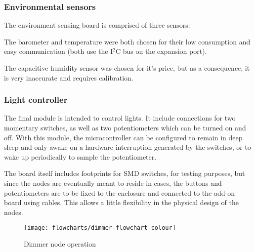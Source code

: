 \subsubsection{Environmental sensors}

The environment sensing board is comprised of three sensors:



The barometer and temperature were both chosen for their low consumption and
easy communication (both use the I$^{2}$C bus on the expansion port).

The capacitive humidity sensor was chosen for it's price, but as a consequence,
it is very inaccurate and requires calibration.

\subsubsection{Light controller}

The final module is intended to control lights. It include connections for two
momentary switches, as well as two potentiometers which can be turned on and
off. With this module, the microcontroller can be configured to remain in deep
sleep and only awake on a hardware interruption generated by the switches, or to
wake up periodically to sample the potentiometer.

The board itself includes footprints for SMD switches, for testing purposes, but
since the nodes are eventually meant to reside in cases, the buttons and
potentiometers are to be fixed to the enclosure and connected to the add-on
board using cables. This allows a little flexibility in the physical design of
the nodes.

\begin{figure}[!h]
  \begin{center}
    \texttt{[image: flowcharts/dimmer-flowchart-colour]}
  \end{center}
  \caption{Dimmer node operation}
  \label{fig:dimmer-flowchart}
\end{figure}

